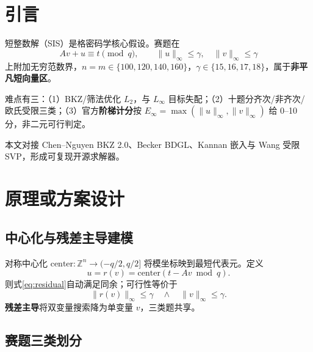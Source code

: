 \documentclass[12pt,a4paper]{ctexart}
\newcommand{\bodyzi}{\zihao{-4}}
\begin{document}
\tableofcontents
\newpage

\bodyzi

\section{引言}

短整数解（SIS）是格密码学核心假设\cite{ajtai1996,micciancio2009book}。赛题在
\begin{equation}\label{eq:main}
  Av+u\equiv t\pmod q,\qquad \|u\|_{\infty}\le\gamma,\quad \|v\|_{\infty}\le\gamma
\end{equation}
上附加无穷范数界，$n=m\in\{100,120,140,160\}$，$\gamma\in\{15,16,17,18\}$，属于\textbf{非平凡短向量区}。

难点有三：（1）BKZ/筛法优化 $L_2$，与 $L_{\infty}$ 目标失配；（2）十题分齐次/非齐次/欧氏受限三类；（3）官方\textbf{阶梯计分}按 $E_\infty=\max(\|u\|_{\infty},\|v\|_{\infty})$ 给 0--10 分\cite{challenge2026}，非二元可行判定。

本文对接 Chen--Nguyen BKZ 2.0\cite{chen2011}、Becker BDGL\cite{becker2016}、Kannan 嵌入\cite{kannan1987}与 Wang 受限 SVP\cite{wang2025}，形成可复现开源求解器。

\section{原理或方案设计}

\subsection{中心化与残差主导建模}

对称中心化 $\mathrm{center}:\mathbb{Z}^n\to(-q/2,q/2]$ 将模坐标映到最短代表元。定义
\begin{equation}\label{eq:residual}
  u=r(v)=\mathrm{center}(t-Av\bmod q).
\end{equation}
则式\eqref{eq:residual}自动满足同余；可行性等价于
\begin{equation}\label{eq:feas}
  \|r(v)\|_{\infty}\le\gamma \quad\land\quad \|v\|_{\infty}\le\gamma.
\end{equation}
\textbf{残差主导}将双变量搜索降为单变量 $v$，三类题共享。

\subsection{赛题三类划分}
\end{document}
